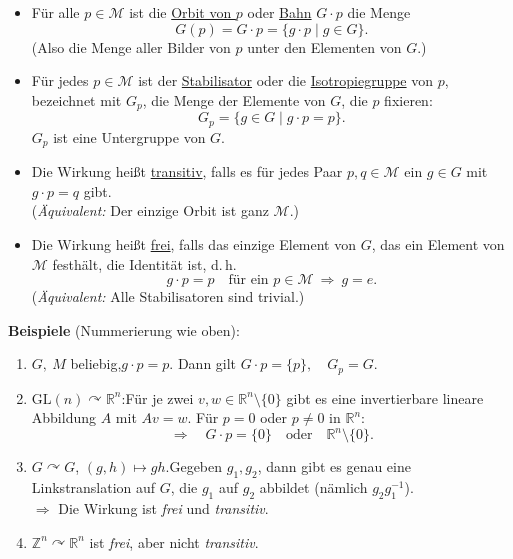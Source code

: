 \documentclass[fleqn, 12pt, letterpaper]{article}
\begin{document}
\begin{itemize}
    \item Für alle $p \in \mathcal{M}$ ist die \underline{Orbit von $p$} oder \underline{Bahn} $G \cdot p$ die Menge
    \[
        G(p) = G \cdot p = \{ g \cdot p \mid g \in G \}.
    \]
    (Also die Menge aller Bilder von $p$ unter den Elementen von $G$.)
    
    \item Für jedes $p \in \mathcal{M}$ ist der \underline{Stabilisator} oder die \underline{Isotropiegruppe} von $p$, bezeichnet mit $G_p$, die Menge der Elemente von $G$, die $p$ fixieren:
    \[
        G_p = \{ g \in G \mid g \cdot p = p \}.
    \]
    $G_p$ ist eine Untergruppe von $G$.
    
    \item Die Wirkung heißt \underline{transitiv}, falls es für jedes Paar $p, q \in \mathcal{M}$ ein $g \in G$ mit $g \cdot p = q$ gibt.\\
    (\emph{Äquivalent:} Der einzige Orbit ist ganz $\mathcal{M}$.)
    
    \item Die Wirkung heißt \underline{frei}, falls das einzige Element von $G$, das ein Element von $\mathcal{M}$ festhält, die Identität ist, d.\,h.
    \[
        g \cdot p = p \quad \text{für ein } p \in \mathcal{M} \ \Rightarrow\ g = e.
    \]
    (\emph{Äquivalent:} Alle Stabilisatoren sind trivial.)
\end{itemize}

\textbf{Beispiele} (Nummerierung wie oben):
\begin{enumerate}
    \item $G ,\ M$ beliebig,\quad $g \cdot p = p$. Dann gilt $G \cdot p = \{p\},\quad G_p = G$.

    \item $\mathrm{GL}(n) \curvearrowright \mathbb{R}^n$:\quad Für je zwei $v, w \in \mathbb{R}^n \setminus \{0\}$ gibt es eine invertierbare lineare Abbildung $A$ mit $Av = w$. Für $p=0$ oder $p\neq 0$ in $\mathbb{R}^n$:
    \[
        \Rightarrow\quad G \cdot p = \{0\} \quad \text{oder} \quad \mathbb{R}^n \setminus \{0\}.
    \]

    \item $G \curvearrowright G$, \quad $(g, h) \mapsto g h$.\quad Gegeben $g_1, g_2$, dann gibt es genau eine Linkstranslation auf $G$, die $g_1$ auf $g_2$ abbildet (nämlich $g_2 g_1^{-1}$).\\
    $\Rightarrow$ Die Wirkung ist \emph{frei} und \emph{transitiv}.

    \item $\mathbb{Z}^n \curvearrowright \mathbb{R}^n$ ist \emph{frei}, aber nicht \emph{transitiv}.
\end{enumerate}
\end{document}
